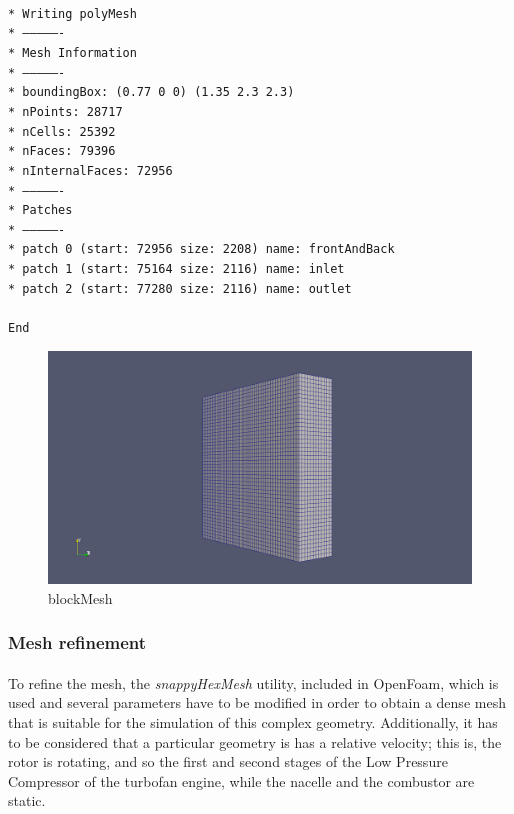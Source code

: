 \texttt{\\*
Writing polyMesh\\*
----------------\\*
Mesh Information\\*
----------------\\*
  boundingBox: (0.77 0 0) (1.35 2.3 2.3)\\*
  nPoints: 28717\\*
  nCells: 25392\\*
  nFaces: 79396\\*
  nInternalFaces: 72956\\*
----------------\\*
Patches\\*
----------------\\*
  patch 0 (start: 72956 size: 2208) name: frontAndBack\\*
  patch 1 (start: 75164 size: 2116) name: inlet\\*
  patch 2 (start: 77280 size: 2116) name: outlet\\
  \\
  End
}

\begin{figure}[h!]
\includegraphics[scale=0.26]{./mesh/screenshots/blockmesh}
\centering
\caption{blockMesh}
\end{figure}


\subsubsection{Mesh refinement}

\paragraph{}To refine the mesh, the \textit{snappyHexMesh} utility, included in OpenFoam, which is used and several parameters have to be modified in order to obtain a dense mesh that is suitable for the simulation of this complex geometry. Additionally, it has to be considered that a particular geometry is has a relative velocity; this is, the rotor is rotating, and so the first and second stages of the Low Pressure Compressor of the turbofan engine, while the nacelle and the combustor are static. 


